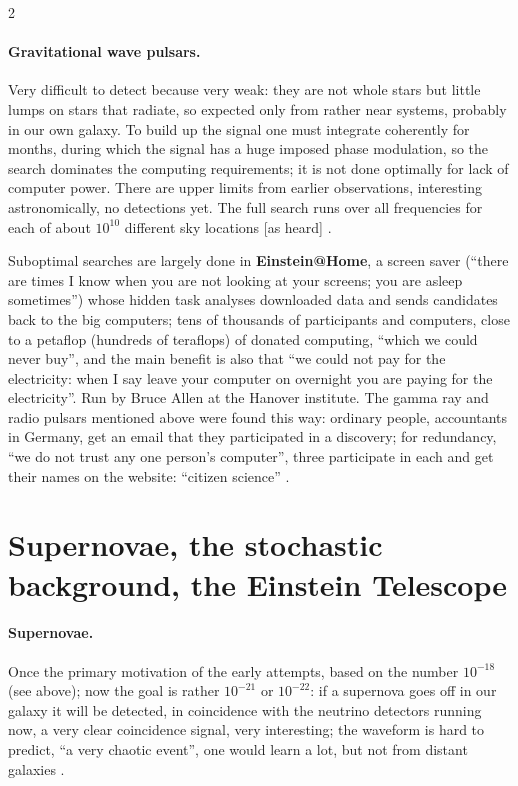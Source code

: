 \begin{paracol}{2}
\paragraph{Gravitational wave pulsars.} Very difficult to detect because very weak: they are not whole stars but little lumps on stars that radiate, so expected only from rather near systems, probably in our own galaxy. To build up the signal one must integrate coherently for months, during which the signal has a huge imposed phase modulation, so the search dominates the computing requirements; it is not done optimally for lack of computer power. There are upper limits from earlier observations, interesting astronomically, no detections yet. The full search runs over all frequencies for each of about $10^{10}$ different sky locations [as heard] .

\begin{aside}
Suboptimal searches are largely done in \textbf{Einstein@Home}, a screen saver (``there are times I know when you are not looking at your screens; you are asleep sometimes'') whose hidden task analyses downloaded data and sends candidates back to the big computers; tens of thousands of participants and computers, close to a petaflop (hundreds of teraflops) of donated computing, ``which we could never buy'', and the main benefit is also that ``we could not pay for the electricity: when I say leave your computer on overnight you are paying for the electricity''. Run by Bruce Allen at the Hanover institute. The gamma ray and radio pulsars mentioned above were found this way: ordinary people, accountants in Germany, get an email that they participated in a discovery; for redundancy, ``we do not trust any one person's computer'', three participate in each and get their names on the website: ``citizen science'' .
\end{aside}

\section{Supernovae, the stochastic background, the Einstein Telescope}\label{sec:c27-other}

\paragraph{Supernovae.} Once the primary motivation of the early attempts, based on the number $10^{-18}$ (see above); now the goal is rather $10^{-21}$ or $10^{-22}$: if a supernova goes off in our galaxy it will be detected, in coincidence with the neutrino detectors running now, a very clear coincidence signal, very interesting; the waveform is hard to predict, ``a very chaotic event'', one would learn a lot, but not from distant galaxies .


\end{paracol}
